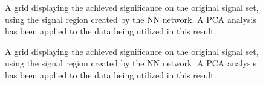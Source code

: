 \begin{figure}
    \caption{A grid displaying the achieved significance on the original signal set, using the signal region 
    created by the \ac{NN} network. A \ac{PCA} analysis has been applied to the data being utilized in this result.}
    \label{fig:PNNPCAComp}
\end{figure}

\begin{figure}
    \caption{A grid displaying the achieved significance on the original signal set, using the signal region 
    created by the \ac{NN} network. A \ac{PCA} analysis has been applied to the data being utilized in this result.}
    \label{fig:PCAComp}
\end{figure}
